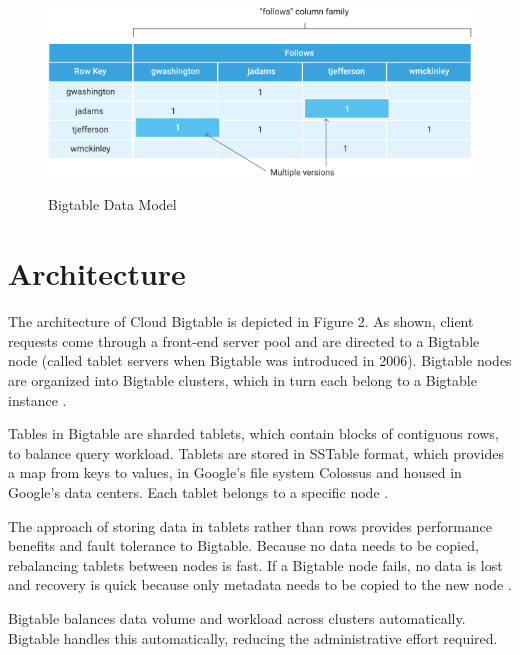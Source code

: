 \documentclass[9pt,twocolumn,twoside]{styles/osajnl}
\begin{document}
\begin{figure}[ht]
  \includegraphics[scale=0.45]{images/bigtable-example.jpg}
  \caption{Bigtable Data Model}\cite{www-bigtabledocoverview}
\end{figure}

\section{Architecture}

The architecture of Cloud Bigtable is depicted in Figure 2.  As shown, client requests come through a front-end server pool and are directed to a Bigtable node (called tablet servers when Bigtable was introduced in 2006). Bigtable nodes are organized into Bigtable clusters, which in turn each belong to a Bigtable instance \cite{www-bigtabledocoverview}.

Tables in Bigtable are sharded tablets, which contain blocks of contiguous rows, to balance query workload. Tablets are stored in SSTable format, which provides a map from keys to values, in Google's file system Colossus and housed in Google's data centers. Each tablet belongs to a specific node \cite{www-bigtabledocoverview}.

The approach of storing data in tablets rather than rows provides performance benefits and fault tolerance to Bigtable. Because no data needs to be copied, rebalancing tablets between nodes is fast. If a Bigtable node fails, no data is lost and recovery is quick because only metadata needs to be copied to the new node  \cite{www-bigtabledocoverview}.

Bigtable balances data volume and workload across clusters automatically. Bigtable handles this automatically, reducing the administrative effort required\cite{www-bigtabledocoverview}.


\vspace{-\topsep}
\end{document}
